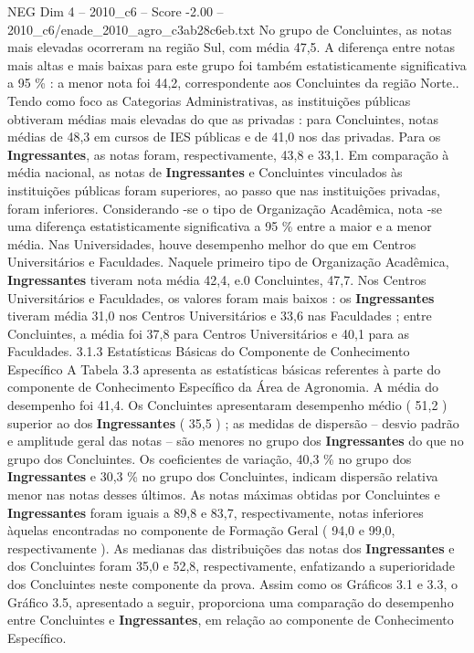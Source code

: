 \begin{textsample}{NEG Dim 4 – 2010\_c6 – Score -2.00 – 2010\_c6/enade\_2010\_agro\_c3ab28c6eb.txt}
No grupo de Concluintes, as notas mais elevadas ocorreram na região Sul, com média 47,5.
A diferença entre notas mais altas e mais baixas para este grupo foi também estatisticamente significativa a 95 \% : a menor nota foi 44,2, correspondente aos Concluintes da região Norte..
Tendo como foco as Categorias Administrativas, as instituições públicas obtiveram médias mais elevadas do que as privadas : para Concluintes, notas médias de 48,3 em cursos de IES públicas e de 41,0 nos das privadas.
Para os \textbf{Ingressantes}, as notas foram, respectivamente, 43,8 e 33,1.
Em comparação à média nacional, as notas de \textbf{Ingressantes} e Concluintes vinculados às instituições públicas foram superiores, ao passo que nas instituições privadas, foram inferiores.
Considerando -se o tipo de Organização Acadêmica, nota -se uma diferença estatisticamente significativa a 95 \% entre a maior e a menor média.
Nas Universidades, houve desempenho melhor do que em Centros Universitários e Faculdades.
Naquele primeiro tipo de Organização Acadêmica, \textbf{Ingressantes} tiveram nota média 42,4, e.0 Concluintes, 47,7.
Nos Centros Universitários e Faculdades, os valores foram mais baixos : os \textbf{Ingressantes} tiveram média 31,0 nos Centros Universitários e 33,6 nas Faculdades ; entre Concluintes, a média foi 37,8 para Centros Universitários e 40,1 para as Faculdades. 3.1.3 Estatísticas Básicas do Componente de Conhecimento Específico A Tabela 3.3 apresenta as estatísticas básicas referentes à parte do componente de Conhecimento Específico da Área de Agronomia.
A média do desempenho foi 41,4.
Os Concluintes apresentaram desempenho médio ( 51,2 ) superior ao dos \textbf{Ingressantes} ( 35,5 ) ; as medidas de dispersão – desvio padrão e amplitude geral das notas – são menores no grupo dos \textbf{Ingressantes} do que no grupo dos Concluintes.
Os coeficientes de variação, 40,3 \% no grupo dos \textbf{Ingressantes} e 30,3 \% no grupo dos Concluintes, indicam dispersão relativa menor nas notas desses últimos.
As notas máximas obtidas por Concluintes e \textbf{Ingressantes} foram iguais a 89,8 e 83,7, respectivamente, notas inferiores àquelas encontradas no componente de Formação Geral ( 94,0 e 99,0, respectivamente ).
As medianas das distribuições das notas dos \textbf{Ingressantes} e dos Concluintes foram 35,0 e 52,8, respectivamente, enfatizando a superioridade dos Concluintes neste componente da prova.
Assim como os Gráficos 3.1 e 3.3, o Gráfico 3.5, apresentado a seguir, proporciona uma comparação do desempenho entre Concluintes e \textbf{Ingressantes}, em relação ao componente de Conhecimento Específico.

\end{textsample}
